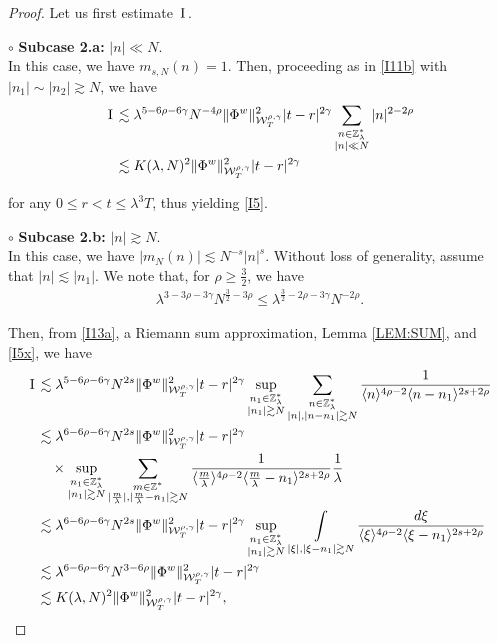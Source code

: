 \documentclass[letterpaper, 11pt,  reqno]{amsart}
\DeclareMathOperator*{\intt}{\int}
\newcommand{\1}{\hspace{0.5mm}\text{I}\hspace{0.5mm}}
\newcommand{\noi}{\noindent}
\newcommand{\Z}{\mathbb{Z}}
\newcommand{\g}{\gamma}
\newcommand{\ld}{\lambda}
\newcommand{\les}{\lesssim}
\newcommand{\ges}{\gtrsim}
\newcommand{\jb}[1]
{\langle #1 \rangle}
\newcommand{\W}{\mathcal{W}}
\numberwithin{equation}{section}
\numberwithin{theorem}{section}
\begin{document}
\begin{proof}
Let us first estimate $\1$.




\noi
$\circ$ {\bf Subcase 2.a:}  $|n| \ll N$.\\
\indent
In this case, we have $m_{s, N}(n) = 1$.
Then, proceeding as in \eqref{I11b} with $|n_1|\sim |n_2|\ges N$, we have 
\begin{align}
\begin{split}
\1
&\les 
\ld^{5-6\rho -6\g}N^{-4\rho }
\| \Phi^{w} \|^2_{\W_{T}^{\rho, \g}} 
|t-r|^{2\g} 
\sum_{\substack{n \in \Z_\ld^*\\|n|\ll N}} |n|^{2-2\rho} \\
 &\les 
K(\ld, N)^2
 \| \Phi^{w} \|^2_{\W_{T}^{\rho, \g}}  
|t-r|^{2\g}
\end{split}
\label{I14}
\end{align}




 \noi
for any $0\leq r<t\leq \ld^3T$, 
thus yielding \eqref{I5}.


\medskip


\noi
$\circ$ {\bf Subcase 2.b:}  $|n| \ges N$.\\
\indent
In this case, we have   $|m_N(n)| \les  N^{-s} |n|^{s}$.
Without loss of generality, assume that $|n|\les |n_1|$.
We note that, for $\rho \ge \frac 32$, we have 
\begin{align}
\ld^{3- 3\rho-3\g} N^{\frac 32 - 3\rho}
\le
\ld^{ \frac 32 - 2\rho - 3\g} N^{-2\rho}.
\label{I5x}
\end{align}

\noi
Then, from \eqref{I13a}, a Riemann sum approximation, 
Lemma \ref{LEM:SUM}, 
and 
\eqref{I5x}, we have
\begin{align}
\1
&\les 
\ld^{5-6\rho -6\g}N^{2s }
\| \Phi^{w} \|^2_{\W_{T}^{\rho, \g}} 
|t-r|^{2\g}
\sup_{\substack{n_1 \in \Z_\ld^*\\|n_1|\ges N} }
\sum_{\substack{n \in \Z_\ld^*\\|n|, |n- n_1|\ges N}} 
\frac{1}{\jb{n}^{4\rho - 2}\jb{n - n_1}^{2s+2\rho}}
\notag \\
&\les 
\ld^{6-6\rho -6\g}N^{2s }
\| \Phi^{w} \|^2_{\W_{T}^{\rho, \g}} 
|t-r|^{2\g}  \notag \\
& \quad 
\times 
\sup_{\substack{n_1 \in \Z_\ld^*\\|n_1|\ges N} }
 \sum_{\substack{m \in \Z^*\\ |\frac m\ld |, |\frac m\ld - n_1|\ges  N}} 
\frac{1}{\jb{\frac{m}{\ld}}^{4\rho - 2}
\jb{ \frac m\ld - n_1}^{2s + 2\rho}}
 \frac 1\ld
\label{I16x}\\
&\les 
\ld^{6-6\rho -6\g}N^{2s }
\| \Phi^{w} \|^2_{\W_{T}^{\rho, \g}} 
|t-r|^{2\g}
\sup_{\substack{n_1 \in \Z_\ld^*\\|n_1|\ges N} }
\intt_{|\xi|, |\xi - n_1|\ges N} 
\frac{d\xi}{\jb{\xi}^{4\rho - 2}
\jb{ \xi - n_1}^{2s + 2\rho}} \notag \\
 &\les 
\ld^{6-6\rho -6\g}N^{3-6\rho }
 \| \Phi^{w} \|^2_{\W_{T}^{\rho, \g}}  
|t-r|^{2\g} \notag \\
 &\les 
K(\ld, N)^2
 \| \Phi^{w} \|^2_{\W_{T}^{\rho, \g}}  
|t-r|^{2\g}, \notag 
\end{align}


\end{proof}
\end{document}
